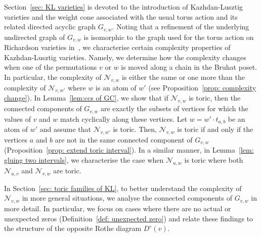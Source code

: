 \documentclass[11pt]{amsart}
\theoremstyle{definition}
\theoremstyle{definition}
\theoremstyle{definition}
\theoremstyle{definition}
\newcommand{\Nvw}{\mathcal{N}_{v,w}}
\newcommand{\Dc}{D^{\circ}}
\begin{document}
Section~\ref{sec: KL varieties} is devoted to the introduction of Kazhdan-Lusztig varieties and the weight cone associated with the usual torus action and its related directed acyclic graph $G_{v,w}$. Noting that a refinement of the underlying undirected graph of $G_{v,w}$ is isomorphic to the graph used for the torus action on Richardson varieties in~\cite{lee21toricbruhatintpolytopes}, we characterise certain complexity properties of Kazhdan-Lusztig varieties. Namely, we determine how the complexity changes when one of the permutations $v$ or $w$ is moved along a chain in the Bruhat poset. In particular, the complexity of $\mathcal N_{v,w}$ is either the same or one more than the complexity of $\mathcal N_{v,w'}$ where $w$ is an atom of $w'$ (see Proposition~\ref{prop: complexity change}). In Lemma~\ref{lem:ccs of GC}, we show that if $\mathcal N_{v,w}$ is toric, then the connected components of $G_{v,w}$ are exactly the subsets of vertices for which the values of $v$ and $w$ match cyclically along these vertices. Let $w = w'\cdot t_{a,b}$ be an atom of $w'$ and assume that $\mathcal N_{v,w'}$ is toric. Then, $\mathcal N_{v,w}$ is toric if and only if the vertices $a$ and $b$ are not in the same connected component of $G_{v,w}$ (Proposition~\ref{prop: extend toric interval}). In a similar manner, in Lemma~\ref{lem: gluing two intervals}, we characterise the case when $\mathcal N_{u,w}$ is toric where both $\mathcal N_{u,v}$ and $\mathcal N_{v,w}$ are toric. 

In Section~\ref{sec: toric families of KL}, to better understand the complexity of $\Nvw$ in more general situations, we analyse the connected components of $G_{v,w}$ in more detail. In particular, we focus on cases where there are no actual or unexpected zeros (Definition~\ref{def: unexpected zero}) and relate these findings to the structure of the opposite Rothe diagram $\Dc(v)$.
\end{document}
